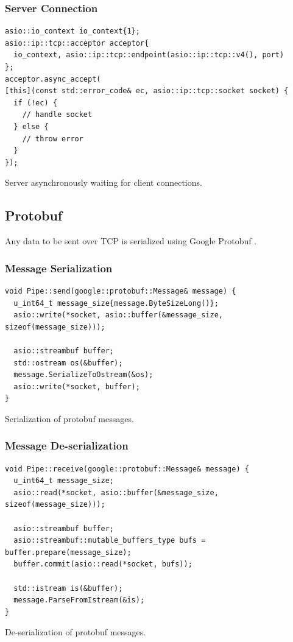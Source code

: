 \documentclass[12pt, letterpaper]{article}
\newenvironment{code}{\captionsetup{type=listing}}{}
\begin{document}
\subsubsection{Server Connection}

\begin{code}
	\begin{verbatim}
asio::io_context io_context{1};
asio::ip::tcp::acceptor acceptor{
  io_context, asio::ip::tcp::endpoint(asio::ip::tcp::v4(), port)
};
acceptor.async_accept(
[this](const std::error_code& ec, asio::ip::tcp::socket socket) {
  if (!ec) {
    // handle socket
  } else {
    // throw error
  }
});
	\end{verbatim}
	\caption{Server asynchronously waiting for client connections.}
	\label{serverConnection}
\end{code}

\subsection{Protobuf}
Any data to be sent over TCP is serialized using Google Protobuf \cite{protobuf}.
\newline

\subsubsection{Message Serialization}
\begin{code}
	\begin{verbatim}
void Pipe::send(google::protobuf::Message& message) {
  u_int64_t message_size{message.ByteSizeLong()};
  asio::write(*socket, asio::buffer(&message_size, sizeof(message_size)));
	
  asio::streambuf buffer;
  std::ostream os(&buffer);
  message.SerializeToOstream(&os);
  asio::write(*socket, buffer);
}
	\end{verbatim}
	\caption{Serialization of protobuf messages.}
	\label{pipeSend}
\end{code}

\subsubsection{Message De-serialization}
\begin{code}
	\begin{verbatim}
void Pipe::receive(google::protobuf::Message& message) {
  u_int64_t message_size;
  asio::read(*socket, asio::buffer(&message_size, sizeof(message_size)));
	
  asio::streambuf buffer;
  asio::streambuf::mutable_buffers_type bufs = buffer.prepare(message_size);
  buffer.commit(asio::read(*socket, bufs));
	
  std::istream is(&buffer);
  message.ParseFromIstream(&is);
}
	\end{verbatim}
	\caption{De-serialization of protobuf messages.}
	\label{pipeReceive}
\end{code}
\end{document}
